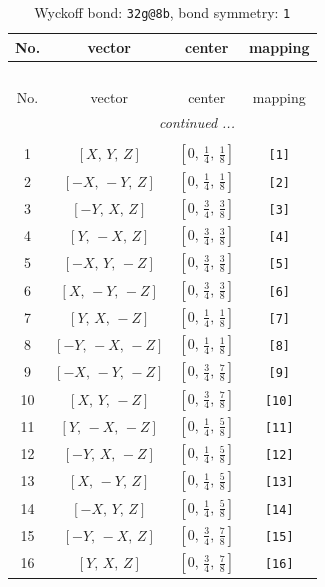 \documentclass[fleqn,8pt]{jsarticle}
\begin{document}
\begin{longtable}{cccc}
\caption{Wyckoff bond: {\tt 32g@8b}, bond symmetry: {\tt 1}}
 \\
 \hline \hline
No. & vector & center & mapping \\ \hline \endfirsthead

\multicolumn{3}{l}{\tablename\ \thetable{}} \\
 \hline \hline
No. & vector & center & mapping \\ \hline \endhead

 \hline \hline
\multicolumn{3}{r}{\footnotesize\it continued ...} \\ \endfoot

 \hline \hline
\multicolumn{3}{r}{} \\ \endlastfoot

1 & $\left[ X,\, Y,\, Z \right]$ & $\left[ 0,\, \frac{1}{4},\, \frac{1}{8} \right]$ & {\tt [1]} \\ \hline
2 & $\left[ - X,\, - Y,\, Z \right]$ & $\left[ 0,\, \frac{1}{4},\, \frac{1}{8} \right]$ & {\tt [2]} \\ \hline
3 & $\left[ - Y,\, X,\, Z \right]$ & $\left[ 0,\, \frac{3}{4},\, \frac{3}{8} \right]$ & {\tt [3]} \\ \hline
4 & $\left[ Y,\, - X,\, Z \right]$ & $\left[ 0,\, \frac{3}{4},\, \frac{3}{8} \right]$ & {\tt [4]} \\ \hline
5 & $\left[ - X,\, Y,\, - Z \right]$ & $\left[ 0,\, \frac{3}{4},\, \frac{3}{8} \right]$ & {\tt [5]} \\ \hline
6 & $\left[ X,\, - Y,\, - Z \right]$ & $\left[ 0,\, \frac{3}{4},\, \frac{3}{8} \right]$ & {\tt [6]} \\ \hline
7 & $\left[ Y,\, X,\, - Z \right]$ & $\left[ 0,\, \frac{1}{4},\, \frac{1}{8} \right]$ & {\tt [7]} \\ \hline
8 & $\left[ - Y,\, - X,\, - Z \right]$ & $\left[ 0,\, \frac{1}{4},\, \frac{1}{8} \right]$ & {\tt [8]} \\ \hline
9 & $\left[ - X,\, - Y,\, - Z \right]$ & $\left[ 0,\, \frac{3}{4},\, \frac{7}{8} \right]$ & {\tt [9]} \\ \hline
10 & $\left[ X,\, Y,\, - Z \right]$ & $\left[ 0,\, \frac{3}{4},\, \frac{7}{8} \right]$ & {\tt [10]} \\ \hline
11 & $\left[ Y,\, - X,\, - Z \right]$ & $\left[ 0,\, \frac{1}{4},\, \frac{5}{8} \right]$ & {\tt [11]} \\ \hline
12 & $\left[ - Y,\, X,\, - Z \right]$ & $\left[ 0,\, \frac{1}{4},\, \frac{5}{8} \right]$ & {\tt [12]} \\ \hline
13 & $\left[ X,\, - Y,\, Z \right]$ & $\left[ 0,\, \frac{1}{4},\, \frac{5}{8} \right]$ & {\tt [13]} \\ \hline
14 & $\left[ - X,\, Y,\, Z \right]$ & $\left[ 0,\, \frac{1}{4},\, \frac{5}{8} \right]$ & {\tt [14]} \\ \hline
15 & $\left[ - Y,\, - X,\, Z \right]$ & $\left[ 0,\, \frac{3}{4},\, \frac{7}{8} \right]$ & {\tt [15]} \\ \hline
16 & $\left[ Y,\, X,\, Z \right]$ & $\left[ 0,\, \frac{3}{4},\, \frac{7}{8} \right]$ & {\tt [16]} \\
\end{longtable}
\end{document}
